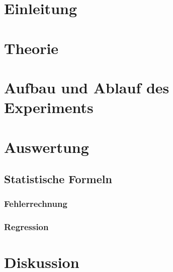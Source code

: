 \documentclass[a4,11pt]{article}
\newcommand{\V}{US1}
\begin{document}



\tableofcontents
\clearpage


\section{Einleitung}


\section{Theorie}

\clearpage


\section{Aufbau und Ablauf des Experiments}

\clearpage


\section{Auswertung}
\subsection{Statistische Formeln}
\subsubsection{Fehlerrechnung}

\subsubsection{Regression}

\clearpage

\clearpage


\section{Diskussion}


\clearpage
\listoftodos
\listoffigures
\listoftables
\clearpage
\nocite{\V}
\printbibliography[title = Literaturverzeichnis]
\end{document}
